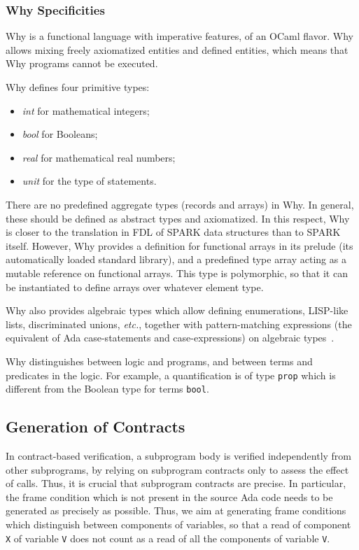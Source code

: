 \documentclass{article}
\newcounter{example}
\newcommand{\etc}{\textit{etc.}\xspace}
\begin{document}
\subsubsection{Why Specificities}

Why is a functional language with imperative features, of an OCaml flavor. Why
allows mixing freely axiomatized entities and defined entities, which means
that Why programs cannot be executed.

Why defines four primitive types:
\begin{itemize}
\item \emph{int} for mathematical integers;
\item \emph{bool} for Booleans;
\item \emph{real} for mathematical real numbers;
\item \emph{unit} for the type of statements.
\end{itemize}

There are no predefined aggregate types (records and arrays) in Why. In
general, these should be defined as abstract types and axiomatized. In this
respect, Why is closer to the translation in FDL of SPARK data structures than
to SPARK itself. However, Why provides a definition for functional arrays in
its prelude (its automatically loaded standard library), and a predefined type
array acting as a mutable reference on functional arrays. This type is
polymorphic, so that it can be instantiated to define arrays over whatever
element type.

Why also provides algebraic types which allow defining enumerations, LISP-like
lists, discriminated unions, \etc, together with pattern-matching expressions
(the equivalent of Ada case-statements and case-expressions) on algebraic
types~\cite{Paskevich09RR}.

Why distinguishes between logic and programs, and between terms and predicates
in the logic. For example, a quantification is of type \verb|prop| which is
different from the Boolean type for terms \verb|bool|.

\subsection{Generation of Contracts}

In contract-based verification, a subprogram body is verified independently
from other subprograms, by relying on subprogram contracts only to assess the
effect of calls. Thus, it is crucial that subprogram contracts are precise. In
particular, the frame condition which is not present in the source Ada code
needs to be generated as precisely as possible. Thus, we aim at generating
frame conditions which distinguish between components of variables, so that a
read of component \verb|X| of variable \verb|V| does not count as a read of
all the components of variable \verb|V|.
\end{document}
